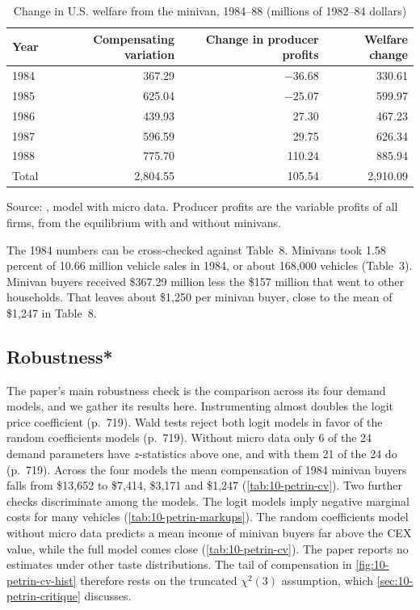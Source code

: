 \begin{table}[htbp]
\centering
\caption{Change in U.S. welfare from the minivan, 1984--88 (millions of 1982--84 dollars)}\label{tab:10-petrin-welfare}
\small
\begin{tabular}{@{}lrrr@{}}
\toprule
Year & Compensating variation & Change in producer profits & Welfare change \\
\midrule
1984  & 367.29   & $-36.68$ & 330.61 \\
1985  & 625.04   & $-25.07$ & 599.97 \\
1986  & 439.93   & 27.30    & 467.23 \\
1987  & 596.59   & 29.75    & 626.34 \\
1988  & 775.70   & 110.24   & 885.94 \\
\midrule
Total & 2,804.55 & 105.54   & 2,910.09 \\
\bottomrule
\end{tabular}

\smallskip
\begin{minipage}{0.8\textwidth}
\footnotesize Source: \citet[Table~13]{Petrin2002}, model with micro data. Producer profits are the variable profits of
all firms, from the equilibrium with and without minivans.
\end{minipage}
\end{table}

The 1984 numbers can be cross-checked against Table~8. Minivans took 1.58 percent of 10.66 million vehicle sales in
1984, or about 168,000 vehicles (Table~3). Minivan buyers received \$367.29 million less the \$157 million that went to
other households. That leaves about \$1,250 per minivan buyer, close to the mean of \$1,247 in Table~8.

\subsection{Robustness*}\label{sec:10-petrin-robustness}

The paper's main robustness check is the comparison across its four demand models, and we gather its results here.
Instrumenting almost doubles the logit price coefficient (p.~719). Wald tests reject both logit models in favor of
the random coefficients models (p.~719). Without micro data only 6 of the 24 demand parameters have $z$-statistics
above one, and with them 21 of the 24 do (p.~719). Across the four models the mean compensation of 1984 minivan
buyers falls from \$13,652 to \$7,414, \$3,171 and \$1,247 (\cref{tab:10-petrin-cv}). Two further checks discriminate
among the models. The logit models imply negative marginal costs for many vehicles (\cref{tab:10-petrin-markups}).
The random coefficients model without micro data predicts a mean income of minivan buyers far above the CEX value,
while the full model comes close (\cref{tab:10-petrin-cv}). The paper reports no estimates under other taste
distributions. The tail of compensation in \cref{fig:10-petrin-cv-hist} therefore rests on the truncated
$\chi^2(3)$ assumption, which \cref{sec:10-petrin-critique} discusses.

